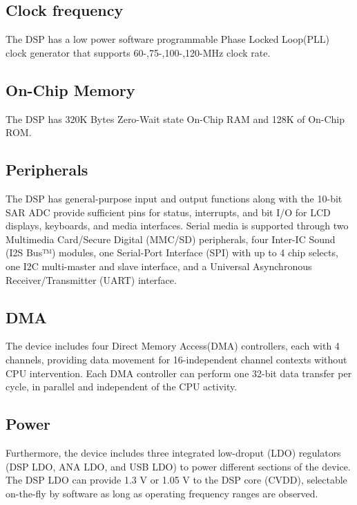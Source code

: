 \subsection{Clock frequency}The DSP has a low power software programmable Phase Locked Loop(PLL) clock generator that  supports 60-,75-,100-,120-MHz clock rate.  
\subsection{On-Chip Memory}The DSP has 320K Bytes Zero-Wait state On-Chip RAM and 128K of On-Chip ROM. 

\subsection{Peripherals} The DSP has general-purpose input and output functions along with the 10-bit SAR ADC provide sufficient pins for status, interrupts, and bit I/O for LCD displays, keyboards, and media interfaces. Serial media is supported through two Multimedia Card/Secure Digital (MMC/SD) peripherals, four Inter-IC Sound (I2S Bus™) modules, one Serial-Port Interface (SPI) with up to 4 chip selects, one I2C multi-master and slave interface, and a Universal Asynchronous Receiver/Transmitter (UART) interface. 

\subsection{DMA} The device includes four Direct Memory Access(DMA) controllers, each with 4 channels, providing data movement for 16-independent channel contexts without CPU intervention. Each DMA controller can perform one 32-bit data transfer per cycle, in parallel and independent of the CPU activity.


\subsection{Power} Furthermore, the device includes three integrated low-droput (LDO) regulators (DSP LDO, ANA LDO, and USB LDO) to power different sections of the device. The DSP LDO can provide 1.3 V or 1.05 V to the DSP core (CVDD), 
selectable on-the-fly by software as long as operating frequency ranges are observed. 


